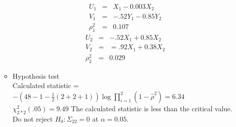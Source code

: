 \documentclass{article}
\begin{document}
\begin{itemize}
\begin{itemize}
\begin{eqnarray*}
U_1 & = & X_1 - 0.003X_2 \\
V_1 & = & -.52Y_1 - 0.85Y_2\\
\rho^2_1 & = & 0.107
\end{eqnarray*}
\begin{eqnarray*}
U_2 & = & -.52X_1 + 0.85X_2 \\
V_2 & = & =.92X_1 + 0.38X_2 \\
\rho^2_2 & = & 0.029
\end{eqnarray*}
\item Hypothesis test \\
Calculated statistic = $-(48 - 1 - \frac{1}{2} (2 + 2 + 1))\log\prod_{i = 1}^2(1 - \hat{\rho}^2) = 6.34$\\
$\chi^2_{2*2}(.05) = 9.49$
The calculated statistic is less than the critical value. \\
Do not reject $H_0: \Sigma_{22} = 0$ at $\alpha = 0.05$.
\end{itemize}
\end{itemize}
\end{document}
